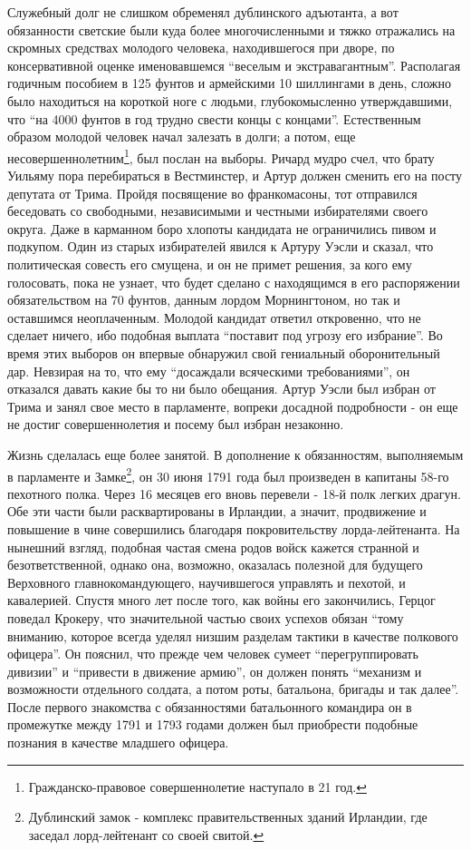 \documentclass[
  oneside,
  12pt,
  titlepage]{book}
\begin{document}
Служебный долг не слишком обременял дублинского адъютанта, а вот обязанности светские были куда более многочисленными и тяжко отражались на скромных средствах молодого человека, находившегося при дворе, по консервативной оценке именовавшемся ``веселым и экстравагантным''. Располагая годичным пособием в 125 фунтов и армейскими 10 шиллингами в день, сложно было находиться на короткой ноге с людьми, глубокомысленно утверждавшими, что ``на 4000 фунтов в год трудно свести концы с концами''. Естественным образом молодой человек начал залезать в долги; а потом, еще несовершеннолетним\footnote{Гражданско-правовое совершеннолетие наступало в 21 год.}, был послан на выборы. Ричард мудро счел, что брату Уильяму пора перебираться в Вестминстер, и Артур должен сменить его на посту депутата от Трима. Пройдя посвящение во франкомасоны, тот отправился беседовать со свободными, независимыми и честными избирателями своего округа. Даже в карманном боро хлопоты кандидата не ограничились пивом и подкупом. Один из старых избирателей явился к Артуру Уэсли и сказал, что политическая совесть его смущена, и он не примет решения, за кого ему голосовать, пока не узнает, что будет сделано с находящимся в его распоряжении обязательством на 70 фунтов, данным лордом Морнингтоном, но так и оставшимся неоплаченным. Молодой кандидат ответил откровенно, что не сделает ничего, ибо подобная выплата ``поставит под угрозу его избрание''. Во время этих выборов он впервые обнаружил свой гениальный оборонительный дар. Невзирая на то, что ему ``досаждали всяческими требованиями'', он отказался давать какие бы то ни было обещания. Артур Уэсли был избран от Трима и занял свое место в парламенте, вопреки досадной подробности - он еще не достиг совершеннолетия и посему был избран незаконно.

Жизнь сделалась еще более занятой. В дополнение к обязанностям, выполняемым в парламенте и Замке\footnote{Дублинский замок - комплекс правительственных зданий Ирландии, где заседал лорд-лейтенант со своей свитой.}, он 30 июня 1791 года был произведен в капитаны 58-го пехотного полка. Через 16 месяцев его вновь перевели - 18-й полк легких драгун. Обе эти части были расквартированы в Ирландии, а значит, продвижение и повышение в чине совершились благодаря покровительству лорда-лейтенанта. На нынешний взгляд, подобная частая смена родов войск кажется странной и безответственной, однако она, возможно, оказалась полезной для будущего Верховного главнокомандующего, научившегося управлять и пехотой, и кавалерией. Спустя много лет после того, как войны его закончились, Герцог поведал Крокеру, что значительной частью своих успехов обязан ``тому вниманию, которое всегда уделял низшим разделам тактики в качестве полкового офицера''. Он пояснил, что прежде чем человек сумеет ``перегруппировать дивизии'' и ``привести в движение армию'', он должен понять ``механизм и возможности отдельного солдата, а потом роты, батальона, бригады и так далее''. После первого знакомства с обязанностями батальонного командира он в промежутке между 1791 и 1793 годами должен был приобрести подобные познания в качестве младшего офицера.
\end{document}
